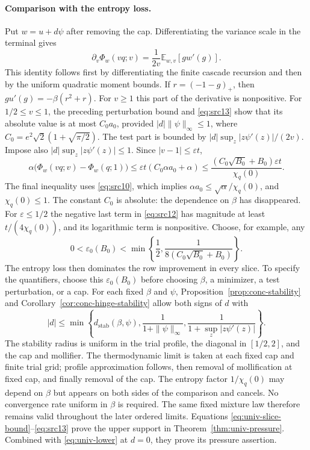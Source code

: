 \documentclass[11pt,a4paper]{article}
\numberwithin{equation}{section}
\theoremstyle{definition}
\theoremstyle{remark}
\newcommand{\E}{\mathbb E}
\newcommand{\eps}{\varepsilon}
\begin{document}
\paragraph{Comparison with the entropy loss.}
Put $w=u+d\psi$ after removing the cap.  Differentiating the variance
scale in the terminal gives
\[
 \partial_v\Phi_w(vq;v)=\frac1{2v}\E_{w,v}[g w'(g)].
\]
This identity follows first by differentiating the finite cascade
recursion and then by the uniform quadratic moment bounds.  If
$r=(-1-g)_+$, then $g u'(g)=-\beta(r^2+r)$.  For $v\ge1$ this part of
the derivative is nonpositive.  For $1/2\le v\le1$, the preceding
perturbation bound and \eqref{eq:src13} show that its absolute value is
at most $C_0a_0$, provided $|d|\|\psi\|_\infty\le1$, where
$C_0=e^2\sqrt2(1+\sqrt{\pi/2})$.
The test part is bounded by $|d|\sup_z|z\psi'(z)|/(2v)$.
Impose also $|d|\sup_z|z\psi'(z)|\le1$.  Since $|v-1|\le\eps t$,
\[
 \alpha\big(\Phi_w(vq;v)-\Phi_w(q;1)\big)
 \le \eps t(C_0\alpha a_0+\alpha)
 \le \frac{(C_0\sqrt{B_0}+B_0)\eps t}{\chi_q(0)}.
\]
The final inequality uses \eqref{eq:src10}, which implies
$\alpha a_0\le\sqrt\alpha/\chi_q(0)$, and $\chi_q(0)\le1$.
The constant $C_0$ is absolute: the dependence on $\beta$ has disappeared.
For $\eps\le1/2$ the negative last term in \eqref{eq:src12} has magnitude
at least $t/(4\chi_q(0))$, and its logarithmic term is nonpositive.
Choose, for example, any
\[
 0<\eps_0(B_0)<
 \min\left\{\frac12,\frac1{8(C_0\sqrt{B_0}+B_0)}\right\}.
\]
The entropy loss then dominates the row improvement in every slice.
To specify the quantifiers, choose this $\eps_0(B_0)$ before choosing
$\beta$, a minimizer, a test perturbation, or a cap.  For each fixed
$\beta$ and $\psi$, Proposition~\ref{prop:conc-stability} and
Corollary~\ref{cor:conc-hinge-stability} allow both
signs of $d$ with
\[
 |d|\le\min\left\{d_{\mathrm{stab}}(\beta,\psi),
       \frac1{1+\|\psi\|_\infty},
       \frac1{1+\sup_z|z\psi'(z)|}\right\}.
\]
The stability radius is uniform in the trial profile, the diagonal in
$[1/2,2]$, and the cap and mollifier.  The thermodynamic limit is taken
at each fixed cap and finite trial grid; profile approximation follows,
then removal of mollification at fixed cap, and finally removal of the
cap.  The entropy factor $1/\chi_q(0)$ may depend on $\beta$ but appears
on both sides of the comparison and cancels.  No convergence rate
uniform in $\beta$ is required.  The same fixed mixture law therefore
remains valid throughout the later ordered limits.
Equations \eqref{eq:univ-slice-bound}--\eqref{eq:src13} prove the upper
support in Theorem~\ref{thm:univ-pressure}.  Combined with
\eqref{eq:univ-lower} at $d=0$, they prove its pressure assertion.
\end{document}
